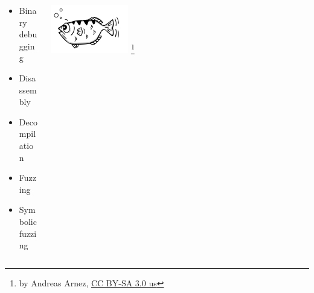 
\begin{frame}








    \begin{columns}[t]
        \begin{column}{0.5\textwidth}
            \begin{itemize}
            \item Binary debugging
            \item Disassembly
            \item Decompilation
            \item Fuzzing
            \item Symbolic fuzzing
            \end{itemize}
        \end{column}
        \begin{column}{0.5\textwidth}
            \includegraphics[width=0.3\textwidth]{assets/GDB_Archer_Fish_by_Andreas_Arnez.svg.png}
            \footnote{\tiny by Andreas Arnez, \href{https://creativecommons.org/licenses/by-sa/3.0/us/deed.en}{CC BY-SA 3.0 us}}


\end{column}
\end{columns}
\end{frame}
